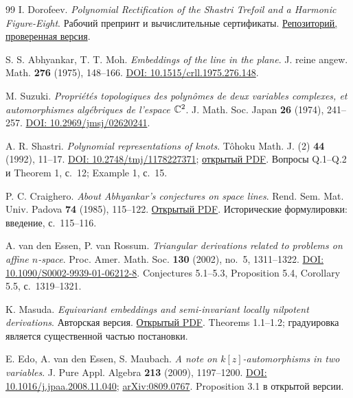 \begin{thebibliography}{99}
\small\setlength{\itemsep}{6pt}
 I. Dorofeev.
\emph{Polynomial Rectification of the Shastri Trefoil and a Harmonic
Figure-Eight}. Рабочий препринт и вычислительные сертификаты.
\href{https://github.com/qft98romanov-hash/abhyankar-moh-trefoil/tree/b954f3609e900761fddc9c8ff03d8301e9604cab}{Репозиторий, проверенная версия}.

 S. S. Abhyankar, T. T. Moh.
\emph{Embeddings of the line in the plane}.
J. reine angew. Math. \textbf{276} (1975), 148--166.
\href{https://doi.org/10.1515/crll.1975.276.148}{DOI: 10.1515/crll.1975.276.148}.

 M. Suzuki.
\emph{Propriétés topologiques des polynômes de deux variables complexes,
et automorphismes algébriques de l'espace ${\mathbb{C}}^2$}.
J. Math. Soc. Japan \textbf{26} (1974), 241--257.
\href{https://doi.org/10.2969/jmsj/02620241}{DOI: 10.2969/jmsj/02620241}.

 A. R. Shastri.
\emph{Polynomial representations of knots}.
Tôhoku Math. J. (2) \textbf{44} (1992), 11--17.
\href{https://doi.org/10.2748/tmj/1178227371}{DOI: 10.2748/tmj/1178227371};
\href{https://www.jstage.jst.go.jp/article/tmj1949/44/1/44_1_11/_pdf}{открытый PDF}.
Вопросы Q.1--Q.2 и Theorem 1, с.~12; Example 1, с.~15.

 P. C. Craighero.
\emph{About Abhyankar's conjectures on space lines}.
Rend. Sem. Mat. Univ. Padova \textbf{74} (1985), 115--122.
\href{https://www.numdam.org/item/RSMUP_1985__74__115_0.pdf}{Открытый PDF}.
Исторические формулировки: введение, с.~115--116.

 A. van den Essen, P. van Rossum.
\emph{Triangular derivations related to problems on affine $n$-space}.
Proc. Amer. Math. Soc. \textbf{130} (2002), no.~5, 1311--1322.
\href{https://doi.org/10.1090/S0002-9939-01-06212-8}{DOI: 10.1090/S0002-9939-01-06212-8}.
Conjectures 5.1--5.3, Proposition 5.4, Corollary 5.5, с.~1319--1321.

 K. Masuda.
\emph{Equivariant embeddings and semi-invariant locally nilpotent
derivations}. Авторская версия.
\href{https://sci-tech.ksc.kwansei.ac.jp/~kayo/cmn/papers/eembed.pdf}{Открытый PDF}.
Theorems 1.1--1.2; градуировка является существенной частью постановки.

 E. Edo, A. van den Essen, S. Maubach.
\emph{A note on $k[z]$-automorphisms in two variables}.
J. Pure Appl. Algebra \textbf{213} (2009), 1197--1200.
\href{https://doi.org/10.1016/j.jpaa.2008.11.040}{DOI: 10.1016/j.jpaa.2008.11.040};
\href{https://arxiv.org/abs/0809.0767}{arXiv:0809.0767}.
Proposition 3.1 в открытой версии.


\end{thebibliography}

